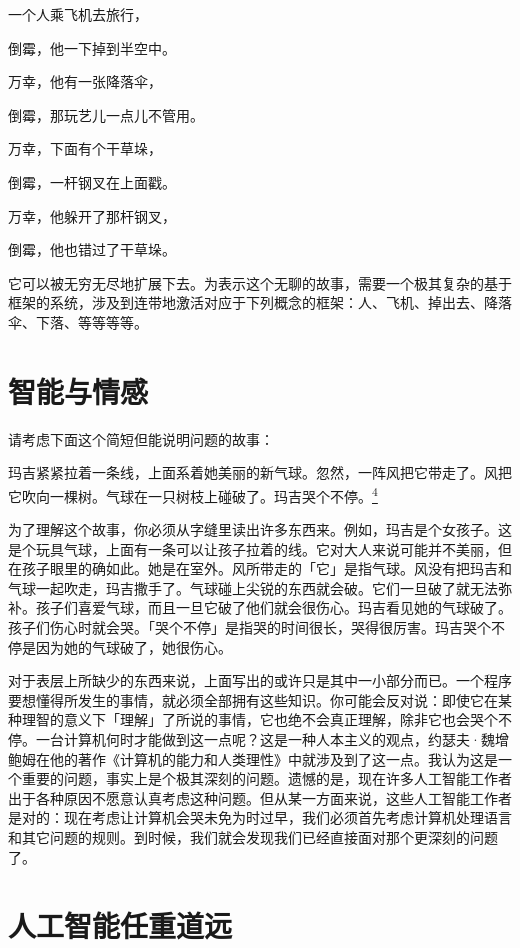 \documentclass[
  12pt,
  twoside,
  openright,
  oldfontcommands,
]{memoir}
\newenvironment{fsquote}{%
  \begin{mdframed}[style=gebquote]\kaitifamily\small%
}{%
  \end{mdframed}%
}
\begin{document}
一个人乘飞机去旅行，

倒霉，他一下掉到半空中。

万幸，他有一张降落伞，

倒霉，那玩艺儿一点儿不管用。

万幸，下面有个干草垛，

倒霉，一杆钢叉在上面戳。

万幸，他躲开了那杆钢叉，

倒霉，他也错过了干草垛。

它可以被无穷无尽地扩展下去。为表示这个无聊的故事，需要一个极其复杂的基于框架的系统，涉及到连带地激活对应于下列概念的框架：人、飞机、掉出去、降落伞、下落、等等等等。

\section{智能与情感}

请考虑下面这个简短但能说明问题的故事：

\begin{fsquote}
玛吉紧紧拉着一条线，上面系着她美丽的新气球。忽然，一阵风把它带走了。风把它吹向一棵树。气球在一只树枝上碰破了。玛吉哭个不停。\hyperref[fn:Chapter19-4]{\textsuperscript{4}}
\end{fsquote}

为了理解这个故事，你必须从字缝里读出许多东西来。例如，玛吉是个女孩子。这是个玩具气球，上面有一条可以让孩子拉着的线。它对大人来说可能并不美丽，但在孩子眼里的确如此。她是在室外。风所带走的「它」是指气球。风没有把玛吉和气球一起吹走，玛吉撒手了。气球碰上尖锐的东西就会破。它们一旦破了就无法弥补。孩子们喜爱气球，而且一旦它破了他们就会很伤心。玛吉看见她的气球破了。孩子们伤心时就会哭。「哭个不停」是指哭的时间很长，哭得很厉害。玛吉哭个不停是因为她的气球破了，她很伤心。

对于表层上所缺少的东西来说，上面写出的或许只是其中一小部分而已。一个程序要想懂得所发生的事情，就必须全部拥有这些知识。你可能会反对说：即使它在某种理智的意义下「理解」了所说的事情，它也绝不会真正理解，除非它也会哭个不停。一台计算机何时才能做到这一点呢？这是一种人本主义的观点，约瑟夫·魏增鲍姆在他的著作《计算机的能力和人类理性》中就涉及到了这一点。我认为这是一个重要的问题，事实上是个极其深刻的问题。遗憾的是，现在许多人工智能工作者出于各种原因不愿意认真考虑这种问题。但从某一方面来说，这些人工智能工作者是对的：现在考虑让计算机会哭未免为时过早，我们必须首先考虑计算机处理语言和其它问题的规则。到时候，我们就会发现我们已经直接面对那个更深刻的问题了。

\section{人工智能任重道远}
\end{document}
